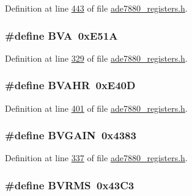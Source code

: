 Definition at line \hyperlink{a00036_source_l00443}{443} of file \hyperlink{a00036_source}{ade7880\-\_\-registers.\-h}.

\hypertarget{a00036_a19e30da5f33e53c72352f8d8bf7f820a}{
\subsubsection[{B\-V\-A}]{\setlength{\rightskip}{0pt plus 5cm}\#define B\-V\-A~0x\-E51\-A}}\label{de/d8c/a00036_a19e30da5f33e53c72352f8d8bf7f820a}


Definition at line \hyperlink{a00036_source_l00329}{329} of file \hyperlink{a00036_source}{ade7880\-\_\-registers.\-h}.

\hypertarget{a00036_a8b6c08ac39feb0337565bccaca6ecdbb}{
\subsubsection[{B\-V\-A\-H\-R}]{\setlength{\rightskip}{0pt plus 5cm}\#define B\-V\-A\-H\-R~0x\-E40\-D}}\label{de/d8c/a00036_a8b6c08ac39feb0337565bccaca6ecdbb}


Definition at line \hyperlink{a00036_source_l00401}{401} of file \hyperlink{a00036_source}{ade7880\-\_\-registers.\-h}.

\hypertarget{a00036_a9a9d28eb690ced7dfa1e126448b167e3}{
\subsubsection[{B\-V\-G\-A\-I\-N}]{\setlength{\rightskip}{0pt plus 5cm}\#define B\-V\-G\-A\-I\-N~0x4383}}\label{de/d8c/a00036_a9a9d28eb690ced7dfa1e126448b167e3}


Definition at line \hyperlink{a00036_source_l00337}{337} of file \hyperlink{a00036_source}{ade7880\-\_\-registers.\-h}.

\hypertarget{a00036_a09f7027a92ccae6bb9b5738d5bc185f3}{
\subsubsection[{B\-V\-R\-M\-S}]{\setlength{\rightskip}{0pt plus 5cm}\#define B\-V\-R\-M\-S~0x43\-C3}}\label{de/d8c/a00036_a09f7027a92ccae6bb9b5738d5bc185f3}


